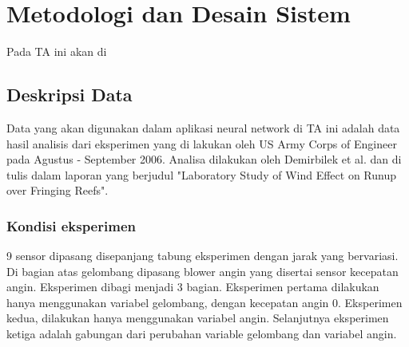\chapter{Metodologi dan Desain Sistem}
Pada TA ini akan di 
\section{Deskripsi Data}
Data yang akan digunakan dalam aplikasi neural network di TA ini adalah data hasil analisis dari eksperimen yang di lakukan oleh US Army Corps of Engineer pada Agustus - September 2006. Analisa dilakukan oleh Demirbilek et al. dan di tulis dalam laporan yang berjudul "Laboratory Study of Wind Effect on Runup over Fringing Reefs".

\subsection{Kondisi eksperimen}
9 sensor dipasang disepanjang tabung eksperimen dengan jarak yang bervariasi. Di bagian atas gelombang dipasang blower angin yang disertai sensor kecepatan angin. Eksperimen dibagi menjadi 3 bagian. Eksperimen pertama dilakukan hanya menggunakan variabel gelombang, dengan kecepatan angin 0. Eksperimen kedua, dilakukan hanya menggunakan variabel angin. Selanjutnya eksperimen ketiga adalah gabungan dari perubahan variable gelombang dan variabel angin.

